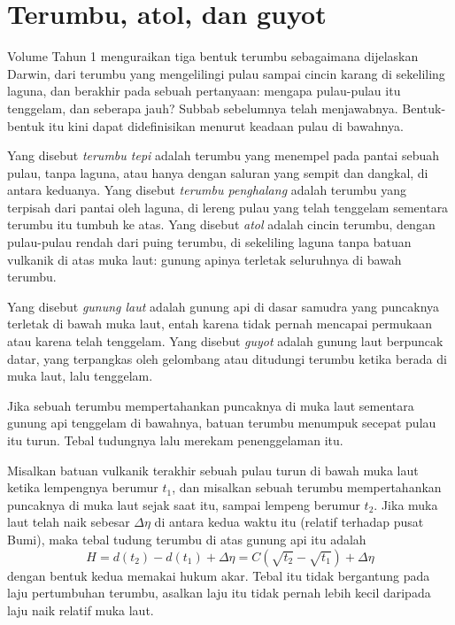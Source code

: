 \section{Terumbu, atol, dan guyot}\label{sec:b2:oceanic-islands:reefs}

Volume Tahun 1 menguraikan tiga bentuk terumbu sebagaimana dijelaskan Darwin, dari terumbu yang mengelilingi
pulau sampai cincin karang di sekeliling laguna, dan berakhir pada sebuah pertanyaan: mengapa pulau-pulau itu tenggelam,
dan seberapa jauh? Subbab sebelumnya telah menjawabnya. Bentuk-bentuk itu kini dapat didefinisikan menurut keadaan
pulau di bawahnya.

\begin{definition}\label{def:b2:oceanic-islands:reefs}
Yang disebut \emph{terumbu tepi} adalah terumbu yang menempel pada pantai sebuah pulau, tanpa
laguna, atau hanya dengan saluran yang sempit dan dangkal, di antara keduanya. Yang disebut \emph{terumbu penghalang}
adalah terumbu yang terpisah dari pantai oleh laguna, di lereng pulau yang telah tenggelam sementara
terumbu itu tumbuh ke atas. Yang disebut \emph{atol} adalah cincin terumbu, dengan pulau-pulau rendah dari puing terumbu,
di sekeliling laguna tanpa batuan vulkanik di atas muka laut: gunung apinya terletak seluruhnya di bawah terumbu.
\end{definition}

\begin{definition}\label{def:b2:oceanic-islands:seamount}
Yang disebut \emph{gunung laut} adalah gunung api di dasar samudra yang puncaknya terletak di bawah muka
laut, entah karena tidak pernah mencapai permukaan atau karena telah tenggelam. Yang disebut
\emph{guyot} adalah gunung laut berpuncak datar, yang terpangkas oleh gelombang atau ditudungi terumbu ketika
berada di muka laut, lalu tenggelam.
\end{definition}

Jika sebuah terumbu mempertahankan puncaknya di muka laut sementara gunung api tenggelam di bawahnya, batuan terumbu menumpuk secepat
pulau itu turun. Tebal tudungnya lalu merekam penenggelaman itu.

\begin{proposition}\label{prop:b2:oceanic-islands:cap}
Misalkan batuan vulkanik terakhir sebuah pulau turun di bawah muka laut ketika lempengnya berumur $t_1$, dan misalkan sebuah
terumbu mempertahankan puncaknya di muka laut sejak saat itu, sampai lempeng berumur $t_2$. Jika muka laut telah naik
sebesar $\Delta\eta$ di antara kedua waktu itu (relatif terhadap pusat Bumi), maka tebal tudung terumbu
di atas gunung api itu adalah
\[
H = d(t_2) - d(t_1) + \Delta\eta = C\left(\sqrt{t_2} - \sqrt{t_1}\right) + \Delta\eta
\]
dengan bentuk kedua memakai hukum akar. Tebal itu tidak bergantung pada laju pertumbuhan terumbu,
asalkan laju itu tidak pernah lebih kecil daripada laju naik relatif muka laut.
\end{proposition}

